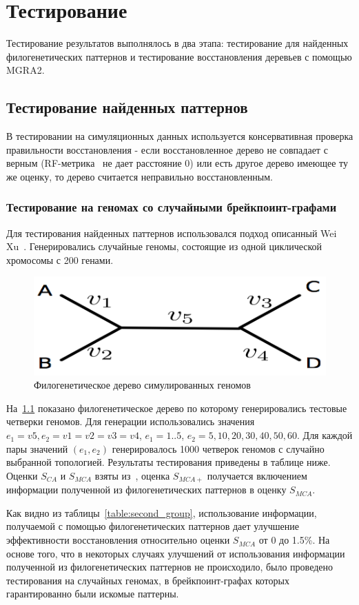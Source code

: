 \chapter{Тестирование}
Тестирование результатов выполнялось в два этапа: тестирование для найденных филогенетических паттернов и тестирование
восстановления деревьев с помощью MGRA2.

\section{Тестирование найденных паттернов}
В тестировании на симуляционных данных используется консервативная проверка правильности восстановления -
если восстановленное дерево не совпадает с верным (RF-метрика~\cite{Robinson1981} не дает расстояние 0) или
есть другое дерево имеющее ту же оценку, то дерево считается неправильно восстановленным.

\subsection{Тестирование на геномах со случайными брейкпоинт-графами}
Для тестирования найденных паттернов использовался подход описанный Wei Xu~\cite{WeiXu2010}.
Генерировались случайные геномы, состоящие из одной циклической хромосомы с 200 генами.
\begin{figure}[H]
  \includegraphics[max width=\textwidth]{fig/3/wei_xu_tree.png}
  \caption{Филогенетическое дерево симулированных геномов~\cite{WeiXu2010}}
  \label{fig:testing_phyl_tree}
\end{figure}
На~\ref{fig:testing_phyl_tree} показано филогенетическое дерево по которому генерировались тестовые четверки геномов.
Для генерации использовались значения $e_1 = v5, e_2 = v1 = v2 = v3 = v4$,
$e_1 = 1..5$, $e_2 = 5, 10, 20, 30, 40, 50, 60$.
Для каждой пары значений $(e_1, e_2)$ генерировалось 1000 четверок геномов с случайно выбранной топологией.
Результаты тестирования приведены в таблице ниже. Оценки $S_{CA}$ и $S_{MCA}$ взяты из~\cite{WeiXu2010},
оценка $S_{MCA+}$ получается включением информации полученной из филогенетических паттернов в оценку $S_{MCA}$.

Как видно из таблицы~\ref{table:second_group}, использование информации,
получаемой с помощью филогенетических паттернов дает улучшение эффективности восстановления относительно оценки $S_{MCA}$ от 0 до 1.5\%.
На основе того, что в некоторых случаях улучшений от использования информации полученной из филогенетических паттернов не происходило,
было проведено тестирования на случайных геномах, в брейкпоинт-графах которых гарантированно были искомые паттерны.

